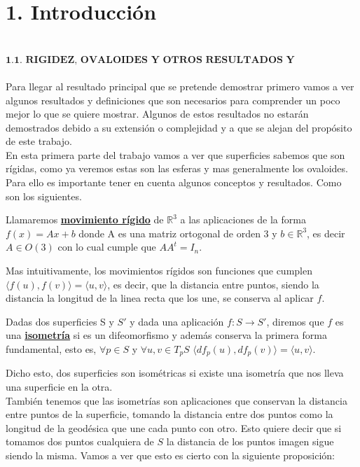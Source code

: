 \chapter*{1. Introducción}


${ }$\\
$\textbf{1.1. RIGIDEZ, OVALOIDES Y OTROS RESULTADOS Y CONCEPTOS}$
${ }$\\

Para llegar al resultado principal que se pretende demostrar primero vamos a ver algunos resultados y definiciones que son necesarios para comprender un poco mejor lo que se quiere mostrar. Algunos de estos resultados no estarán demostrados debido a su extensión o complejidad y a que se alejan del propósito de este trabajo.
${ }$\\

En esta primera parte del trabajo vamos a ver que superficies sabemos que son rígidas, como ya veremos estas son las esferas y mas generalmente los ovaloides. Para ello es importante tener en cuenta algunos conceptos y resultados. Como son los siguientes.


\begin{definicion}
	Llamaremos \underline{\textbf{movimiento rígido}} de $\mathbb{R}^3$ a las aplicaciones de la forma $f(x) = Ax + b$ donde A es una matriz ortogonal de orden 3 y $b \in \mathbb{R}^3$, es decir $A \in O(3)$ con lo cual cumple que $AA^{t} = I_{n}$.
\end{definicion}

Mas intuitivamente, los movimientos rígidos son funciones que cumplen $\langle f(u), f(v) \rangle = \langle u, v \rangle$, es decir, que la distancia entre puntos, siendo la distancia la longitud de la linea recta que los une, se conserva al aplicar $f$.

\begin{definicion}\label{def:isom} %
	Dadas dos superficies S y $S'$ y dada una aplicación $f : S \longrightarrow S'$, diremos que $f$ es una \underline{\textbf{isometría}} si es un difeomorfismo y además conserva la primera forma fundamental, esto es, $\forall p \in S$ y $\forall u,v \in T_p S$ $\langle df_p(u), df_p(v)\rangle = \langle u, v\rangle$.
\end{definicion}

Dicho esto, dos superficies son isométricas si existe una isometría que nos lleva una superficie en la otra.
	${}$\\
	
También tenemos que las isometrías son aplicaciones que conservan la distancia entre puntos de la superficie, tomando la distancia entre dos puntos como la longitud de la geodésica que une cada punto con otro. Esto quiere decir que si tomamos dos puntos cualquiera de $S$ la distancia de los puntos imagen sigue siendo la misma. Vamos a ver que esto es cierto con la siguiente proposición:

